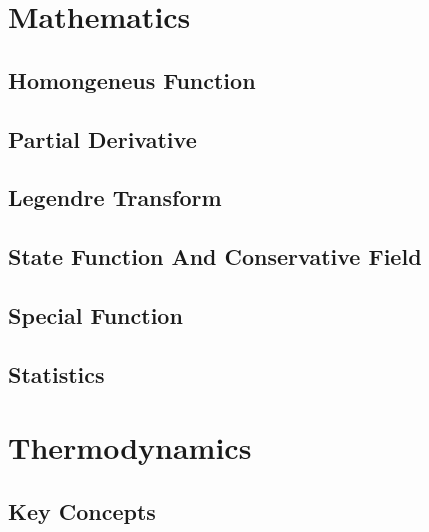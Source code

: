 \documentclass[10pt]{report}
\begin{document}
\pagestyle{empty}

\nocite{Boas2005}\nocite{Faisca2022}\nocite{Puri2024}\nocite{Serway2014}

\chapter*{Mathematics}
\section*{Homongeneus Function}
\clearpage

\section*{Partial Derivative}
\clearpage

\section*{Legendre Transform}
\clearpage

\section*{State Function And Conservative Field}
\clearpage

\section*{Special Function}
\clearpage 

\section*{Statistics}


\chapter*{Thermodynamics}

\section*{Key Concepts}
\clearpage
\end{document}
